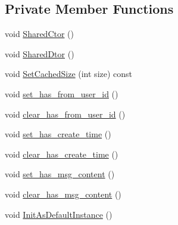 \subsection*{Private Member Functions}
\begin{DoxyCompactItemize}
\item 
void \hyperlink{class_i_m_1_1_base_define_1_1_server_group_msg_a126e7f9a9c88d52b77ab5a00006c6440}{Shared\+Ctor} ()
\item 
void \hyperlink{class_i_m_1_1_base_define_1_1_server_group_msg_a086ee7f16fae892ccff530d9272fcbe2}{Shared\+Dtor} ()
\item 
void \hyperlink{class_i_m_1_1_base_define_1_1_server_group_msg_a2ae3c9788fce75bc3c2068bda6bf8d64}{Set\+Cached\+Size} (int size) const 
\item 
void \hyperlink{class_i_m_1_1_base_define_1_1_server_group_msg_a96eee27b97598cf6d8dc0f967b0c14f2}{set\+\_\+has\+\_\+from\+\_\+user\+\_\+id} ()
\item 
void \hyperlink{class_i_m_1_1_base_define_1_1_server_group_msg_ae9d5e0e4f1b7bddda7e204028d03498e}{clear\+\_\+has\+\_\+from\+\_\+user\+\_\+id} ()
\item 
void \hyperlink{class_i_m_1_1_base_define_1_1_server_group_msg_ad9364f37e6959fc28f07e5c994d83622}{set\+\_\+has\+\_\+create\+\_\+time} ()
\item 
void \hyperlink{class_i_m_1_1_base_define_1_1_server_group_msg_a29e800238e93b6bba03eb3a628c5424b}{clear\+\_\+has\+\_\+create\+\_\+time} ()
\item 
void \hyperlink{class_i_m_1_1_base_define_1_1_server_group_msg_a9413a5dd24e81bd6f6f7e2c196fc4322}{set\+\_\+has\+\_\+msg\+\_\+content} ()
\item 
void \hyperlink{class_i_m_1_1_base_define_1_1_server_group_msg_a93278a3beab7add1208a863b7fe5bf53}{clear\+\_\+has\+\_\+msg\+\_\+content} ()
\item 
void \hyperlink{class_i_m_1_1_base_define_1_1_server_group_msg_a62ae3d43aecb90564a3c001e60d64935}{Init\+As\+Default\+Instance} ()
\end{DoxyCompactItemize}
